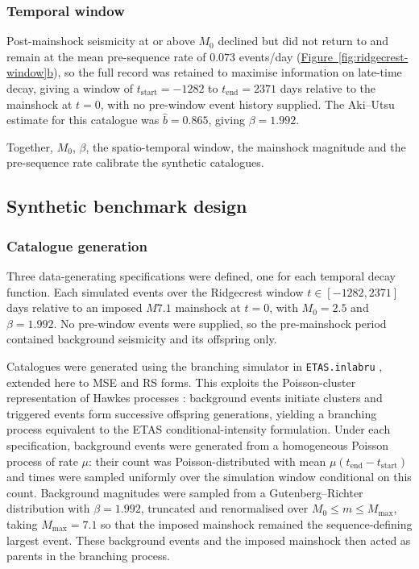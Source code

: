 \documentclass{statsmsc}
\begin{document}
\subsubsection{Temporal window} 

Post-mainshock seismicity at or above $M_0$ declined but did not return to and remain at the mean pre-sequence rate of $0.073$ events/day (\hyperref[fig:ridgecrest-window]{Figure~\ref*{fig:ridgecrest-window}b}), so the full record was retained to maximise information on late-time decay, giving a window of $t_\mathrm{start} = -1282$ to $t_\mathrm{end} = 2371$ days relative to the mainshock at $t=0$, with no pre-window event history supplied. The Aki--Utsu estimate for this catalogue was $\hat{b}=0.865$, giving $\beta =1.992$. 

Together, $M_0$, $\beta$, the spatio-temporal window, the mainshock magnitude and the pre-sequence rate calibrate the synthetic catalogues.

\subsection{Synthetic benchmark design} \label{sec:design}

\subsubsection{Catalogue generation} \label{sec:generation}

Three data-generating specifications were defined, one for each temporal decay function. Each simulated events over the Ridgecrest window $t\in[-1282, 2371]$ days relative to an imposed $M7.1$ mainshock at $t=0$, with $M_0 = 2.5$ and $\beta = 1.992$. No pre-window events were supplied, so the pre-mainshock period contained background seismicity and its offspring only. 

Catalogues were generated using the branching simulator in \texttt{ETAS.inlabru} \citep{naylor2023bayesian}, extended here to MSE and RS forms. This exploits the Poisson-cluster representation of Hawkes processes \citep{hawkes1974cluster}: background events initiate clusters and triggered events form successive offspring generations, yielding a branching process equivalent to the ETAS conditional-intensity formulation. Under each specification, background events were generated from a homogeneous Poisson process of rate $\mu$: their count was Poisson-distributed with mean $\mu(t_\mathrm{end}-t_\mathrm{start})$ and times were sampled uniformly over the simulation window conditional on this count. Background magnitudes were sampled from a Gutenberg--Richter distribution with $\beta = 1.992$, truncated and renormalised over $M_0 \leq m \leq M_\mathrm{max}$, taking $M_\mathrm{max} = 7.1$ so that the imposed mainshock remained the sequence-defining largest event. These background events and the imposed mainshock then acted as parents in the branching process.
\end{document}
